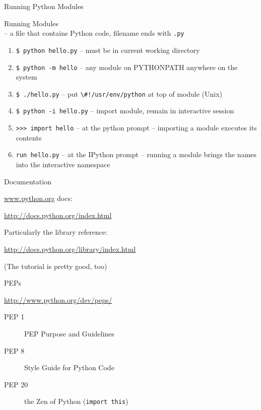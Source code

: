 \documentclass{beamer}
\begin{document}
\begin{frame}[fragile]{Running Python Modules}


{\Large Running Modules}\\[0.05in]
-- a file that contains Python code, filename ends with \verb+.py+

 \begin{enumerate}
    \item \verb+$ python hello.py+  -- must be in current working directory

    \item \verb+$ python -m hello+  -- any module on PYTHONPATH anywhere on the system

    \item \verb+$ ./hello.py+       -- put \verb+\#!/usr/env/python+ at top of module (Unix)
   
    \item \verb+$ python -i hello.py+  -- import module, remain in interactive session 

    \item \verb+>>> import hello+    -- at the python prompt -- importing a module executes its contents

    \item \verb+run hello.py+    -- at the IPython prompt -- running a module brings the names into the interactive namespace
\end{enumerate}

\end{frame} 

\begin{frame}[fragile]{Documentation}

{\Large \url{www.python.org} docs:}

\url{http://docs.python.org/index.html}

\vspace{0.25in}
{\Large Particularly the library reference:}

\url{http://docs.python.org/library/index.html}

\vspace{0.25in}
(The tutorial is pretty good, too)

\end{frame} 

\begin{frame}[fragile]{PEPs}

{\large \url{http://www.python.org/dev/peps/} }

\vspace{0.25in}
\begin{description}
  \item[PEP 1]   PEP Purpose and Guidelines
  \item[PEP 8]   Style Guide for Python Code
  \item[PEP 20]  the Zen of Python (\verb+import this+)
\end{description}

\end{frame} 
\end{document}

